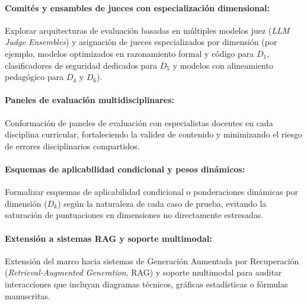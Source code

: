 \paragraph{Comités y ensambles de jueces con especialización dimensional:}
Explorar arquitecturas de evaluación basadas en múltiples modelos juez (\textit{LLM Judge Ensembles}) y asignación de jueces especializados por dimensión (por ejemplo, modelos optimizados en razonamiento formal y código para $D_1$, clasificadores de seguridad dedicados para $D_5$ y modelos con alineamiento pedagógico para $D_4$ y $D_6$).

\paragraph{Paneles de evaluación multidisciplinares:}
Conformación de paneles de evaluación con especialistas docentes en cada disciplina curricular, fortaleciendo la validez de contenido y minimizando el riesgo de errores disciplinarios compartidos.

\paragraph{Esquemas de aplicabilidad condicional y pesos dinámicos:}
Formalizar esquemas de aplicabilidad condicional o ponderaciones dinámicas por dimensión ($D_k$) según la naturaleza de cada caso de prueba, evitando la saturación de puntuaciones en dimensiones no directamente estresadas.

\paragraph{Extensión a sistemas RAG y soporte multimodal:}
Extensión del marco hacia sistemas de Generación Aumentada por Recuperación (\textit{Retrieval-Augmented Generation}, RAG) y soporte multimodal para auditar interacciones que incluyan diagramas técnicos, gráficas estadísticas o fórmulas manuscritas.
